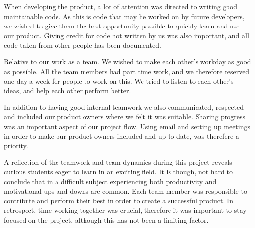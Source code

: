 When developing the product, a lot of attention was directed to writing good maintainable code. As this is code that may be worked on by future developers, we wished to give them the best opportunity possible to quickly learn and use our product. Giving credit for code not written by us was also important, and all code taken from other people has been documented. 

Relative to our work as a team. We wished to make each other's workday as good as possible. All the team members had part time work, and we therefore reserved one day a week for people to work on this. We tried to listen to each other's ideas, and help each other perform better.

In addition to having good internal teamwork we also communicated, respected and included our product owners where we felt it was suitable. Sharing progress was an important aspect of our project flow. Using email and setting up meetings in order to make our product owners included and up to date, was therefore a priority.

A reflection of the teamwork and team dynamics during this project reveals curious students eager to learn in an exciting field. It is though, not hard to conclude that in a difficult subject experiencing both productivity and motivational ups and downs are common. Each team member was responsible to contribute and perform their best in order to create a successful product. In retrospect, time working together was crucial, therefore it was important to stay focused on the project, although this has not been a limiting factor.
